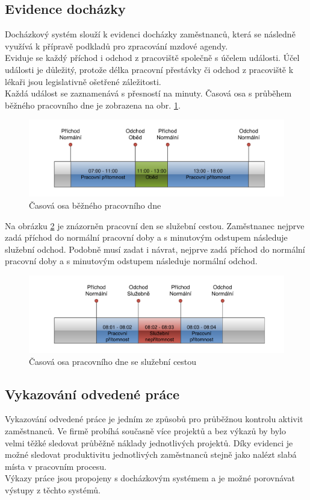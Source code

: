 \documentclass{diplomka}
\begin{document}
\subsection{Evidence docházky}
Docházkový systém slouží k evidenci docházky zaměstnanců, která se následně využívá k přípravě podkladů pro zpracování mzdové agendy.\\ \indent
Eviduje se každý příchod i odchod z pracoviště společně s účelem události. Účel události je důležitý, protože délka pracovní přestávky či odchod z pracoviště k lékaři jsou legislativně ošetřené záležitosti.\\ \indent Každá událost se zaznamenává s přesností na minuty. Časová osa s průběhem běžného pracovního dne je zobrazena na obr. \ref{fig:attn}.
\begin{figure}[H]
  \centering
  \includegraphics[scale=0.7]{visio/attnormal.pdf}
\caption{Časová osa běžného pracovního dne}
\label{fig:attn}
\end{figure}

Na obrázku \ref{fig:atts} je znázorněn pracovní den se služební cestou. Zaměstnanec nejprve zadá příchod do normální pracovní doby a s minutovým odstupem následuje služební odchod. Podobně musí zadat i návrat, nejprve zadá příchod do normální pracovní doby a s minutovým odstupem následuje normální odchod.
\begin{figure}[H]
  \centering
  \includegraphics[scale=0.7]{visio/attservice.pdf}
\caption{Časová osa pracovního dne se služební cestou}
\label{fig:atts}
\end{figure}

\subsection{Vykazování odvedené práce}
Vykazování odvedené práce je jedním ze způsobů pro průběžnou kontrolu aktivit zaměstnanců. Ve firmě probíhá současně více projektů a bez výkazů by bylo velmi těžké sledovat průběžně náklady jednotlivých projektů. 
Díky evidenci je možné sledovat produktivitu jednotlivých zaměstnanců stejně jako nalézt slabá místa v pracovním procesu.
\\ \indent Výkazy práce jsou propojeny s docházkovým systémem a je možné porovnávat výstupy z těchto systémů. 
\end{document}

